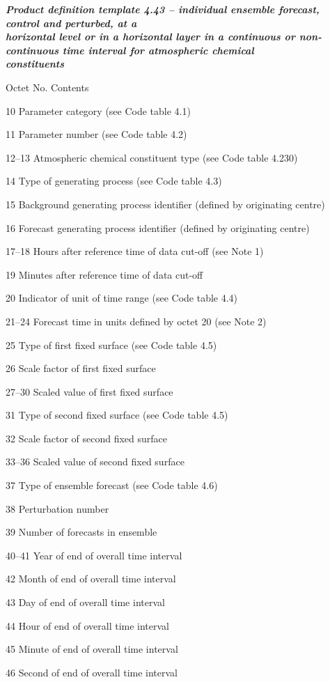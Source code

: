 \emph{\textbf{Product definition template 4.43 -- individual ensemble forecast, control and perturbed, at a\\
horizontal level or in a horizontal layer in a continuous or non-continuous time interval for atmospheric chemical\\
constituents}}

Octet No. Contents

10 Parameter category (see Code table 4.1)

11 Parameter number (see Code table 4.2)

12--13 Atmospheric chemical constituent type (see Code table 4.230)

14 Type of generating process (see Code table 4.3)

15 Background generating process identifier (defined by originating centre)

16 Forecast generating process identifier (defined by originating centre)

17--18 Hours after reference time of data cut-off (see Note 1)

19 Minutes after reference time of data cut-off

20 Indicator of unit of time range (see Code table 4.4)

21--24 Forecast time in units defined by octet 20 (see Note 2)

25 Type of first fixed surface (see Code table 4.5)

26 Scale factor of first fixed surface

27--30 Scaled value of first fixed surface

31 Type of second fixed surface (see Code table 4.5)

32 Scale factor of second fixed surface

33--36 Scaled value of second fixed surface

37 Type of ensemble forecast (see Code table 4.6)

38 Perturbation number

39 Number of forecasts in ensemble

40--41 Year of end of overall time interval

42 Month of end of overall time interval

43 Day of end of overall time interval

44 Hour of end of overall time interval

45 Minute of end of overall time interval

46 Second of end of overall time interval

